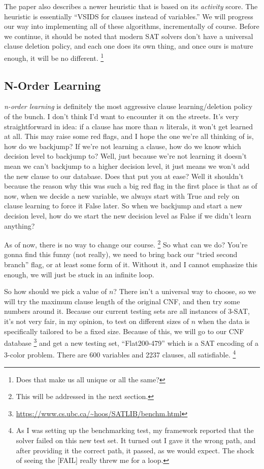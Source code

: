 The paper also describes a newer heuristic that is based on its \textit{activity} score. 
The heuristic is essentially ``VSIDS for clauses instead of variables.'' We will progress our 
way into implementing all of these algorithms, incrementally of course. Before we continue, it 
should be noted that modern SAT solvers don't have a universal clause deletion policy, and each 
one does its own thing, and once ours is mature enough, it will be no different.
\footnote{Does that make us all unique or all the same?}

\subsection{N-Order Learning}

\textit{n-order learning} is definitely the most aggressive clause learning/deletion policy of 
the bunch. I don't think I'd want to encounter it on the streets. It's very straightforward in 
idea: if a clause has more than $n$ literals, it won't get learned at all. This may raise some red 
flags, and I hope the one we're all thinking of is, how do we backjump? If we're not learning a clause, 
how do we know which decision level to backjump to? Well, just because we're not learning it doesn't 
mean we can't backjump to a higher decision level, it just means we won't add the new clause to our 
database. Does that put you at ease? Well it shouldn't because the reason why this was such a big 
red flag in the first place is that as of now, when we decide a new variable, we always start with 
True and rely on clause learning to force it False later. So when we backjump and start a new 
decision level, how do we start the new decision level as False if we didn't learn anything?

As of now, there is no way to change our course.
\footnote{This will be addressed in the next section.}
So what can we do? You're gonna find this funny (not really), we need to bring back our 
``tried second branch'' flag, or at least some form of it. Without it, and I cannot emphasize 
this enough, we will just be stuck in an infinite loop.

So how should we pick a value of $n$? There isn't a universal way to choose, so we will try 
the maximum clause length of the original CNF, and then try some numbers around it. Because 
our current testing sets are all instances of 3-SAT, it's not very fair, in my opinion, to 
test on different sizes of $n$ when the data is specifically tailored to be a fixed size. Because 
of this, we will go to our CNF database 
\footnote{\url{https://www.cs.ubc.ca/~hoos/SATLIB/benchm.html}}
and get a new testing set, ``Flat200-479'' which is a SAT encoding of a 3-color problem. There are 
600 variables and 2237 clauses, all satisfiable.
\footnote{As I was setting up the benchmarking test, my framework reported that the solver failed on 
this new test set. It turned out I gave it the wrong path, and after providing it the correct path, it 
passed, as we would expect. The shock of seeing the [FAIL] really threw me for a loop.}

